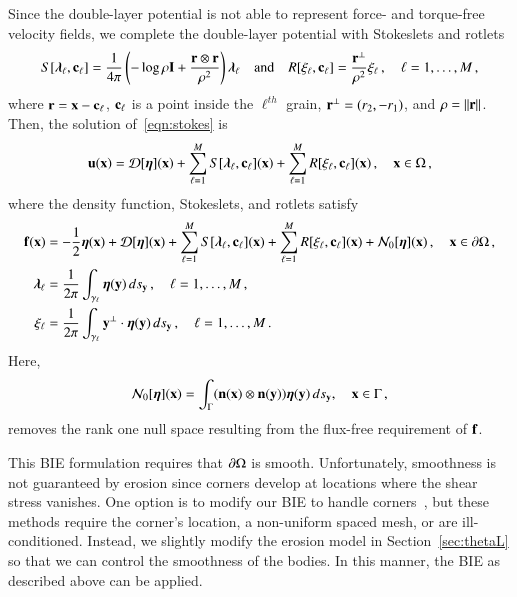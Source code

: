 \documentclass[preprint, 10pt]{elsarticle}
\begin{document}
Since the double-layer potential is not able to represent force- and torque-free velocity fields,  we complete the double-layer potential with Stokeslets and rotlets~\cite{pow-mir1987, pow1993}
\begin{align}
  S[{\boldsymbol\lambda}_\ell,{\mathbf{c}}_\ell] = \frac{1}{4\pi} \left(-\log \rho {\mathbf{I}} + 
    \frac{{\mathbf{r}} \otimes {\mathbf{r}}}{\rho^2} \right){\boldsymbol\lambda}_\ell
  \quad \text{and} \quad
  R[\xi_\ell,{\mathbf{c}}_\ell] = \frac{{\mathbf{r}}^\perp}{\rho^2}\xi_\ell\, , 
  \quad \ell=1,\ldots,M \, ,
  \label{eqn:stokeslet_rotlet}
\end{align}
where  ${\mathbf{r}} = {\mathbf{x}} - {\mathbf{c}}_\ell$, ${\mathbf{c}}_\ell$ is a point inside the $\ell^{th}$ grain, ${\mathbf{r}}^\perp = (r_2,-r_1)$, and $\rho = \|{\mathbf{r}}\|$.  Then, the solution of~\eqref{eqn:stokes} is
\begin{align}
  \label{eqn:completed_DLP}
  {\mathbf{u}}({\mathbf{x}}) = {\mathcal{D}}[{\boldsymbol\eta}]({\mathbf{x}}) + 
    \sum_{\ell=1}^{M} S[{\boldsymbol\lambda}_\ell,{\mathbf{c}}_\ell]({\mathbf{x}}) +
    \sum_{\ell=1}^{M} R[\xi_\ell,{\mathbf{c}}_\ell]({\mathbf{x}})\, , \quad {\mathbf{x}} \in \Omega \, ,
\end{align}
where the density function, Stokeslets, and rotlets satisfy
\begin{subequations}
\label{eqn:completed_BIE}
\begin{align}
  {\mathbf{f}}({\mathbf{x}}) &= -\frac{1}{2}{\boldsymbol\eta}({\mathbf{x}}) + {\mathcal{D}}[{\boldsymbol\eta}]({\mathbf{x}}) + 
      \sum_{\ell=1}^{M} S[{\boldsymbol\lambda}_\ell,{\mathbf{c}}_\ell]({\mathbf{x}}) +
      \sum_{\ell=1}^{M} R[\xi_\ell,{\mathbf{c}}_\ell]({\mathbf{x}}) + {\mathcal{N}}_0[{\boldsymbol\eta}]({\mathbf{x}})\, ,
      \quad {\mathbf{x}} \in {\partial}\Omega \, , 
      \label{eqn:DLP}\\
  {\boldsymbol\lambda}_\ell &= \frac{1}{2\pi}\int_{\gamma_\ell} {\boldsymbol\eta}({\mathbf{y}}) \,
  ds_{\mathbf{y}}\, ,
  \quad \ell=1,\ldots,M \, ,
  \label{eqn:stokeslet} \\
  \xi_\ell &= \frac{1}{2\pi}\int_{\gamma_\ell} {\mathbf{y}}^\perp \cdot {\boldsymbol\eta}({\mathbf{y}})
  \, ds_{\mathbf{y}}\, , \quad \ell=1,\ldots,M \, .
  \label{eqn:rotlet}
\end{align}
\end{subequations}
Here,
\begin{align}
  {\mathcal{N}}_0[{\boldsymbol\eta}]({\mathbf{x}}) = \int_{\Gamma} 
    ({\mathbf{n}}({\mathbf{x}}) \otimes {\mathbf{n}}({\mathbf{y}})){\boldsymbol\eta}({\mathbf{y}}) \, ds_{\mathbf{y}}, \quad {\mathbf{x}} \in
    \Gamma\, ,
\end{align}
removes the rank one null space resulting from the flux-free requirement of ${\mathbf{f}}$.

This BIE formulation requires that ${\partial}\Omega$ is smooth.  Unfortunately, smoothness is not guaranteed by erosion since corners develop at locations where the shear stress vanishes.  One option is to modify our BIE to handle corners~\cite{rac-ser2017, ser-rok2016, hel2011, gil-hao-mar2014, bre2012}, but these methods require the corner's location, a non-uniform spaced mesh, or are ill-conditioned.  Instead, we slightly modify the erosion model in Section~\ref{sec:thetaL} so that we can control the smoothness of the bodies.  In this manner, the BIE as described above can be applied.
\end{document}
